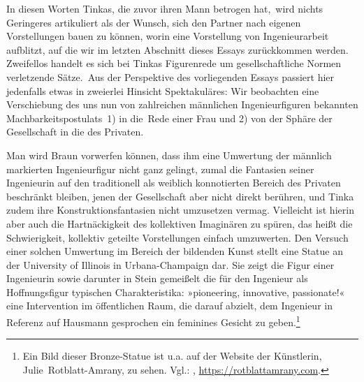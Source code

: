 \documentclass[%
	fontsize=10pt,%
	twoside,%
	headings=optiontoheadandtoc,%
	showtrims]{scrbook}
\renewcommand{\texttt}{\nohyphens} %
\begin{document}
\par In diesen Worten Tinkas, die zuvor ihren Mann betrogen hat,~wird nichts Geringeres artikuliert als der Wunsch, sich den Partner nach eigenen Vorstellungen bauen zu können, worin eine Vorstellung von Ingenieurarbeit aufblitzt, auf die wir im letzten Abschnitt dieses Essays zurückkommen werden. Zweifellos handelt es sich bei Tinkas Figurenrede um gesellschaftliche Normen verletzende \texttt{Sätze.~Aus} der Perspektive des vorliegenden Essays passiert hier jedenfalls etwas in zweierlei Hinsicht Spektakuläres: Wir beobachten eine Verschiebung des uns nun von zahlreichen männlichen Ingenieurfiguren bekannten \texttt{Machbarkeitspostulats~1)} in \texttt{die~Rede} einer Frau und 2) von der Sphäre der Gesellschaft in die des Privaten.\par Man wird Braun vorwerfen können, dass ihm eine Umwertung der männlich markierten Ingenieurfigur nicht ganz gelingt, zumal die Fantasien seiner Ingenieurin auf den traditionell als weiblich konnotierten Bereich des Privaten beschränkt bleiben, jenen der Gesellschaft aber nicht direkt berühren, und Tinka zudem ihre Konstruktionsfantasien nicht umzusetzen vermag. Vielleicht ist hierin aber auch die Hartnäckigkeit des kollektiven Imaginären zu spüren, das heißt die Schwierigkeit, kollektiv geteilte Vorstellungen einfach umzuwerten. Den Versuch einer solchen Umwertung im Bereich der bildenden Kunst stellt eine Statue an der University of Illinois in Urbana-Champaign dar. Sie zeigt die Figur einer Ingenieurin sowie darunter in Stein gemeißelt die für den Ingenieur als Hoffnungsfigur typischen Charakteristika: »pioneering, innovative, passionate!« \textendash{} eine Intervention im öffentlichen Raum, die darauf abzielt, dem Ingenieur \textendash{} in Referenz auf Hausmann gesprochen \textendash{} ein feminines Gesicht zu geben.\footnote{Ein Bild dieser Bronze-Statue ist u.a. auf der Website der Künstlerin, \texttt{Julie~Rotblatt-Amrany}, zu sehen. Vgl.: \cite[][]{rotblatt-amrany-a}, \url{https://rotblattamrany.com}.} 
\end{document}
